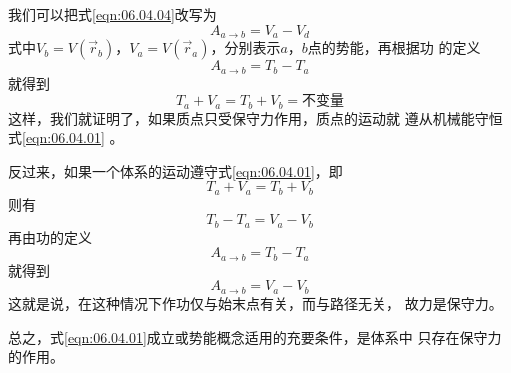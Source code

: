我们可以把式\eqref{eqn:06.04.04}改写为
\begin{equation}\label{eqn:06.04.05}
  A _ { a \to b } = V _ { a } - V _ { d }
\end{equation}
式中$ V _ { b } = V \left( \vec{ r } _ { b } \right) $，$  V _ { a } = V \left( \vec{ r } _ { a } \right) $，分别表示$ a $，$ b $点的势能，再根据功
的定义
\begin{equation}\label{eqn:06.04.06}
  A _ { a \to b } = T _ { b } - T _ { a }
\end{equation}
就得到
\begin{equation}\label{eqn:06.04.07}
  T _ { a } + V _ { a } = T _ { b } + V _ { b } =  \text{不变量}
\end{equation}
这样，我们就证明了，如果质点只受保守力作用，质点的运动就
遵从机械能守恒\lhbrak 式\eqref{eqn:06.04.01} \rhbrak 。

\clearpage
反过来，如果一个体系的运动遵守式\eqref{eqn:06.04.01}，即
\begin{equation*}
  T _ { a } + V _ { a } = T _ { b } + V _ { b }
\end{equation*}
则有\vspace{-1.56em}
\begin{equation*}
  T _ { b } - T _ { a } = V _ { a } - V _ { b }
\end{equation*}
再由功的定义
\begin{equation*}
  A _ { a \to b } = T _ { b } - T _ { a }
\end{equation*}
就得到\vspace{-1.56em}
\begin{equation*}
  A _ { a \to b } = V _ { a } - V _ { b }
\end{equation*}
这就是说，在这种情况下作功仅与始末点有关，而与路径无关，
故力是保守力。

总之，式\eqref{eqn:06.04.01}成立或势能概念适用的充要条件，是体系中
只存在保守力的作用。